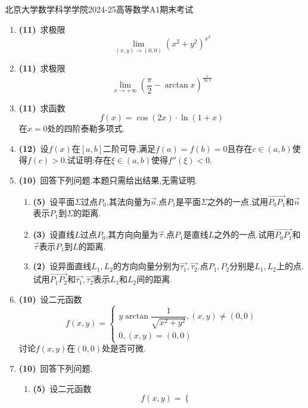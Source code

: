 \documentclass{ctexart}
\begin{document}
\pagestyle{empty}

\begin{center}\Large
    北京大学数学科学学院2024-25高等数学A1期末考试
\end{center}
\begin{enumerate}[leftmargin=*,label=\textbf{\arabic*.}]
    \item \textbf{(11)}\ 求极限\[\lim_{(x,y)\to(0,0)}\left(x^2+y^2\right)^{x^2}\]
    \item \textbf{(11)}\ 求极限\[\lim_{x\to+\infty}\left(\dfrac{\pi}{2}-\arctan x\right)^{\frac{1}{\ln x}}\]
    \item \textbf{(11)}\ 求函数\[f(x)=\cos(2x)\cdot\ln(1+x)\]在$x=0$处的四阶泰勒多项式.
    \item \textbf{(12)}\ 设$f(x)$在$[a,b]$二阶可导,满足$f(a)=f(b)=0$且存在$c\in(a,b)$使得$f(c)>0$.试证明:存在$\xi\in(a,b)$使得$f''(\xi)<0$.
    \item \textbf{(10)}\ 回答下列问题.本题只需给出结果,无需证明.
        \begin{enumerate}[label=\tbf{(\arabic*)}]
            \item \textbf{(5)}\ 设平面$\Sigma$过点$P_0$,其法向量为$\vec{n}$.点$P_1$是平面$\Sigma$之外的一点.试用$\overrightarrow{P_0P_1}$和$\vec{n}$表示$P_1$到$\Sigma$的距离.
            \item \textbf{(3)}\ 设直线$L$过点$P_0$,其方向向量为$\vec{\tau}$.点$P_1$是直线$L$之外的一点.试用$\overrightarrow{P_0P_1}$和$\vec{\tau}$表示$P_1$到$L$的距离.
            \item \textbf{(2)}\ 设异面直线$L_1,L_2$的方向向量分别为$\vec{\tau_1},\vec{\tau_2}$.点$P_1,P_2$分别是$L_1,L_2$上的点.试用$\overrightarrow{P_1P_2}$和$\vec{\tau_1},\vec{\tau_2}$表示$L_1$和$L_2$间的距离.
        \end{enumerate}
    \item \textbf{(10)}\ 设二元函数\[f(x,y)=\left\{\begin{array}{l}
            y\arctan\dfrac{1}{\sqrt{x^2+y^2}},(x,y)\neq(0,0)\\
            0,(x,y)=(0,0)
        \end{array}\right.\]讨论$f(x,y)$在$(0,0)$处是否可微.
    \item \textbf{(10)}\ 回答下列问题.
        \begin{enumerate}[label=\tbf{(\arabic*)}]
            \item \textbf{(5)}\ 设二元函数\[f(x,y)=\left\{\begin{array}{l}

\end{array}\]
\end{enumerate}
\end{enumerate}
\end{document}
